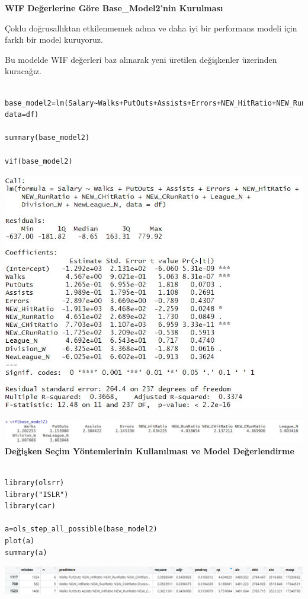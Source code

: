 \documentclass[
]{article}
\begin{document}
\textbf{WIF Değerlerine Göre Base\_Model2'nin Kurulması}

Çoklu doğrusallıktan etkilenmemek adına ve daha iyi bir performans
modeli için farklı bir model kuruyoruz.

Bu modelde WIF değerleri baz alınarak yeni üretilen değişkenler
üzerinden kuracağız.

\begin{verbatim}

base_model2=lm(Salary~Walks+PutOuts+Assists+Errors+NEW_HitRatio+NEW_RunRatio+NEW_CHitRatio+NEW_CRunRatio+League_N+Division_W+NewLeague_N, data=df)

summary(base_model2)

vif(base_model2)
\end{verbatim}

\includegraphics{Capture2.JPG}

\includegraphics[width=10.46875in,height=\textheight]{Capture3.JPG}\textbf{Değişken
Seçim Yöntemlerinin Kullanılması ve Model Değerlendirme}

\begin{verbatim}

library(olsrr)
library("ISLR")
library(car)

a=ols_step_all_possible(base_model2)
plot(a)
summary(a)
\end{verbatim}

\includegraphics[width=9.83333in,height=\textheight]{Picture2.png}
\end{document}
